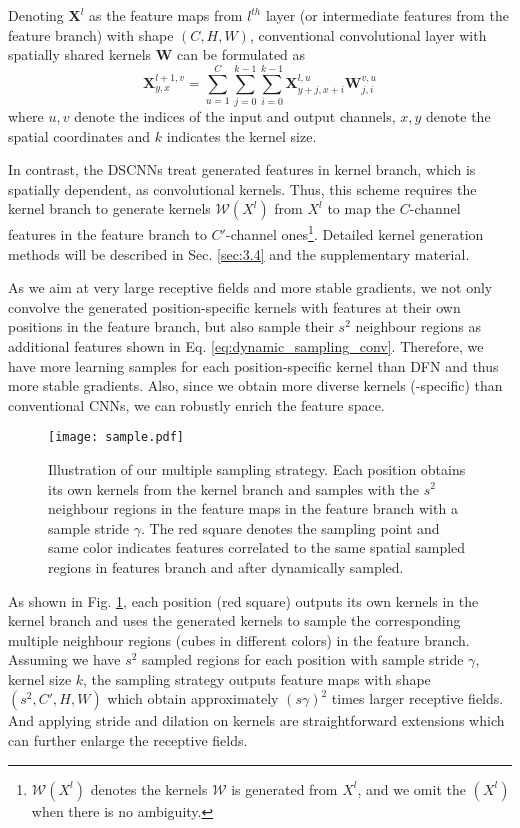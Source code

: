 \documentclass[runningheads]{llncs}
\begin{document}
Denoting $\textbf{X}^{l}$ as the feature maps from $l^{th}$ layer (or intermediate features from the feature branch) with shape $(C,H,W)$, conventional convolutional layer with spatially shared kernels $\textbf{W}$ can be formulated as 
\begin{equation}
    \textbf{X}_{y,x}^{l+1,v} = \sum\limits_{u = 1}^{C}\sum\limits_{j = 0}^{k - 1}\sum\limits_{i = 0}^{k-1} \textbf{X}^{l,u}_{y+j,x+i}\textbf{W}^{v,u}_{j,i}
    \label{eq:norm_conv}
\end{equation}
where $u,v$ denote the indices of the input and output channels, $x,y$ denote the spatial coordinates and $k$ indicates the kernel size.

In contrast, the DSCNNs treat generated features in kernel branch, which is spatially dependent, as convolutional kernels. Thus, this scheme requires the kernel branch to generate kernels $\mathcal{W}(X^l)$ from $X^{l}$ to map the $C$-channel features in the feature branch to $C'$-channel ones\footnote{$\mathcal{W}(X^l)$ denotes the kernels $\mathcal{W}$ is generated from $X^l$, and we omit the $(X^l)$ when there is no ambiguity.}. 
Detailed kernel generation methods will be described in Sec. \ref{sec:3.4} and the supplementary material.

As we aim at very large receptive fields and more stable gradients, we not only convolve the generated position-specific kernels with features at their own positions in the feature branch, but also sample their $s^2$ neighbour regions as additional features shown in Eq. \ref{eq:dynamic_sampling_conv}. Therefore, we have more learning samples for each position-specific kernel than DFN \cite{de2016dynamic} and thus more stable gradients. Also, since we obtain more diverse kernels (\ie\position-specific) than conventional CNNs, we can robustly enrich the feature space. 

\begin{figure}[h]
\centering
\texttt{[image: sample.pdf]}
\caption{Illustration of our multiple sampling strategy. Each position obtains its own kernels from the kernel branch and samples with the $s^2$ neighbour regions in the feature maps in the feature branch with a sample stride $\gamma$. The red square denotes the sampling point and same color indicates features correlated to the same spatial sampled regions in features branch and after dynamically sampled.}
\label{fig:dense_sample}
\end{figure}

As shown in Fig. \ref{fig:dense_sample}, each position (\eg \the red square) outputs its own kernels in the kernel branch and uses the generated kernels to sample the corresponding multiple neighbour regions (\ie \the cubes in different colors) in the feature branch. Assuming we have $s^2$ sampled regions for each position with sample stride $\gamma$, kernel size $k$, the sampling strategy outputs feature maps with shape $(s^2, C', H, W)$ which obtain approximately $(s\gamma)^2$ times larger receptive fields. And applying stride and dilation on kernels are straightforward extensions which can further enlarge the receptive fields.  
\end{document}

